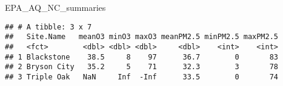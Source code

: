 \documentclass[]{article}
\newenvironment{Shaded}{\begin{snugshade}}{\end{snugshade}}
\newcommand{\NormalTok}[1]{#1}
\begin{document}
\begin{Shaded}
\begin{Highlighting}[]
\NormalTok{EPA_AQ_NC_summaries}
\end{Highlighting}
\end{Shaded}

\begin{verbatim}
## # A tibble: 3 x 7
##   Site.Name   meanO3 minO3 maxO3 meanPM2.5 minPM2.5 maxPM2.5
##   <fct>        <dbl> <dbl> <dbl>     <dbl>    <int>    <int>
## 1 Blackstone    38.5     8    97      36.7        0       83
## 2 Bryson City   35.2     5    71      32.3        3       78
## 3 Triple Oak   NaN     Inf  -Inf      33.5        0       74
\end{verbatim}
\end{document}
